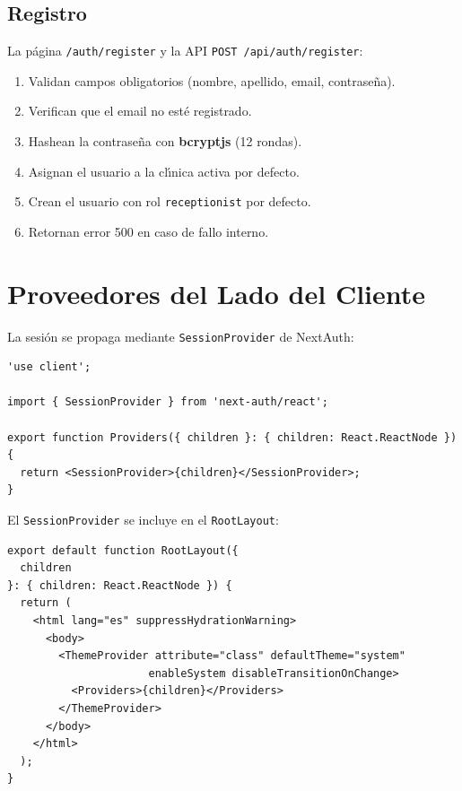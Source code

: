 \subsection{Registro}

La p\'agina \texttt{/auth/register} y la API \texttt{POST /api/auth/register}:

\begin{enumerate}
    \item Validan campos obligatorios (nombre, apellido, email, contrase\~na).
    \item Verifican que el email no est\'e registrado.
    \item Hashean la contrase\~na con \textbf{bcryptjs} (12 rondas).
    \item Asignan el usuario a la cl\'{\i}nica activa por defecto.
    \item Crean el usuario con rol \texttt{receptionist} por defecto.
    \item Retornan error 500 en caso de fallo interno.
\end{enumerate}

\section{Proveedores del Lado del Cliente}

La sesi\'on se propaga mediante \texttt{SessionProvider} de NextAuth:

\begin{lstlisting}[style=typescript, caption=providers.tsx]
'use client';

import { SessionProvider } from 'next-auth/react';

export function Providers({ children }: { children: React.ReactNode }) {
  return <SessionProvider>{children}</SessionProvider>;
}
\end{lstlisting}

El \texttt{SessionProvider} se incluye en el \texttt{RootLayout}:

\begin{lstlisting}[style=typescript, caption=RootLayout]
export default function RootLayout({
  children
}: { children: React.ReactNode }) {
  return (
    <html lang="es" suppressHydrationWarning>
      <body>
        <ThemeProvider attribute="class" defaultTheme="system"
                      enableSystem disableTransitionOnChange>
          <Providers>{children}</Providers>
        </ThemeProvider>
      </body>
    </html>
  );
}
\end{lstlisting}

